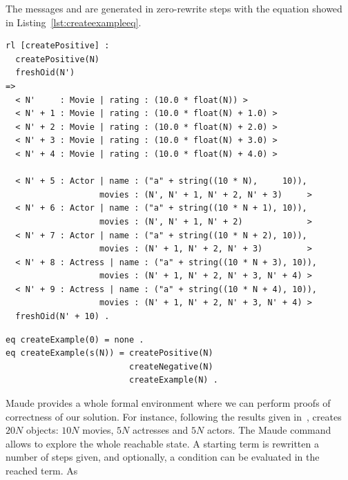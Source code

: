 The messages  and  are generated in zero-rewrite steps with the equation showed in Listing~\ref{lst:createexampleeq}.

\begin{lstlisting}[caption=\code{createPositive} Maude rule., label=lst:createPositive]
rl [createPositive] :
  createPositive(N)
  freshOid(N')
=>
  < N'     : Movie | rating : (10.0 * float(N)) >
  < N' + 1 : Movie | rating : (10.0 * float(N) + 1.0) >
  < N' + 2 : Movie | rating : (10.0 * float(N) + 2.0) >
  < N' + 3 : Movie | rating : (10.0 * float(N) + 3.0) >
  < N' + 4 : Movie | rating : (10.0 * float(N) + 4.0) >
  
  < N' + 5 : Actor | name : ("a" + string((10 * N),     10)),
                   movies : (N', N' + 1, N' + 2, N' + 3)     >
  < N' + 6 : Actor | name : ("a" + string((10 * N + 1), 10)),
                   movies : (N', N' + 1, N' + 2)             >
  < N' + 7 : Actor | name : ("a" + string((10 * N + 2), 10)),
                   movies : (N' + 1, N' + 2, N' + 3)         >
  < N' + 8 : Actress | name : ("a" + string((10 * N + 3), 10)),
                   movies : (N' + 1, N' + 2, N' + 3, N' + 4) >
  < N' + 9 : Actress | name : ("a" + string((10 * N + 4), 10)),
                   movies : (N' + 1, N' + 2, N' + 3, N' + 4) >
  freshOid(N' + 10) .
\end{lstlisting}

\begin{lstlisting}[label=lst:createexampleeq, caption=Equation \code{createExample(N:Nat)}.]
eq createExample(0) = none .
eq createExample(s(N)) = createPositive(N)
                         createNegative(N)
                         createExample(N) .
\end{lstlisting}

Maude provides a whole formal environment where we can perform proofs of correctness of our solution. For instance, following the results given in~\cite{imdbcase},  creates $20N$ objects: $10N$ movies, $5N$ actresses and $5N$ actors. The Maude  command allows to explore the whole reachable state. A starting term is rewritten a number of steps given, and optionally, a condition can be evaluated in the reached term. As 





